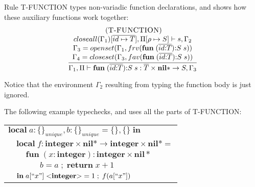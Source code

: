 \documentclass{sigplanconf}
\newcommand{\Nil}{\mathbf{nil}}
\newcommand{\Integer}{\mathbf{integer}}
\newcommand{\String}{\mathbf{string}}
\newcommand{\Void}{\Nil{*}}
\newcommand{\mylabel}[1]{\; (\textsc{#1})}
\newcommand{\env}{\Gamma}
\newcommand{\penv}{\Pi}
\newcommand{\ret}{\rho}
\begin{document}
Rule {\sc T-FUNCTION} types non-variadic function declarations,
and shows how these auxiliary functions work together:
\[
\begin{array}{c}
\mylabel{T-FUNCTION}\\
\dfrac{\begin{array}{c}
	closeall(\env_{1})[\overline{id \mapsto T}], \penv[\ret \mapsto S] \vdash s, \env_{2}\\
	\env_{3} = openset(\env_{1}, frv(\mathbf{fun} \; (\overline{id{:}T}){:}S \; s)) \\
	\env_{4} = closeset(\env_{3}, fav(\mathbf{fun} \; (\overline{id{:}T}){:}S \; s))
	\end{array}}
{\env_{1}, \penv \vdash \mathbf{fun} \; (\overline{id{:}T}){:}S \; s:\overline{T} \times \Void \rightarrow S, \env_{3}}
\end{array}
\]

Notice that the environment $\env_{2}$ resulting from
typing the function body is just ignored.

The following example typechecks, and uses all the parts of {\sc T-FUNCTION}:
\begin{center}
\begin{tabular}{llll}
\multicolumn{4}{l}{$\mathbf{local} \; a:\{\}_{unique}, b:\{\}_{unique} = \{\}, \{\} \; \mathbf{in}$}\\
& \multicolumn{3}{l}{$\mathbf{local} \; f:\Integer \times \Void \rightarrow \Integer \times \Void =$}\\
& & \multicolumn{2}{l}{$\mathbf{fun} \; (x:\Integer):\Integer \times \Void$}\\
& & & \multicolumn{1}{l}{$b = a \;;\; \mathbf{return} \; x + 1$}\\
& \multicolumn{3}{l}{$\mathbf{in} \; a[``x"] \; {<}\Integer{>} = 1 \;;\; f(a[``x"])$}\\
\end{tabular}
\end{center}
\end{document}
